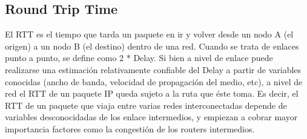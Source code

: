 \subsection {Round Trip Time}

El RTT es el tiempo que tarda un paquete en ir y volver desde un nodo A (el origen) a un nodo B (el destino) dentro de una red. 
Cuando se trata de enlaces punto a punto, se define como 2 * Delay. 
Si bien a nivel de enlace puede realizarse una estimación relativamente confiable del Delay a partir de variables conocidas (ancho de banda, velocidad de propagación del medio, etc), a nivel de red el RTT de un paquete IP queda sujeto a la ruta que éste toma.
Es decir, el RTT de un paquete que viaja entre varias redes interconectadas depende de variables desconocidadas de los enlace intermedios, y empiezan a cobrar mayor importancia factores como la congestión de los routers intermedios.
	
